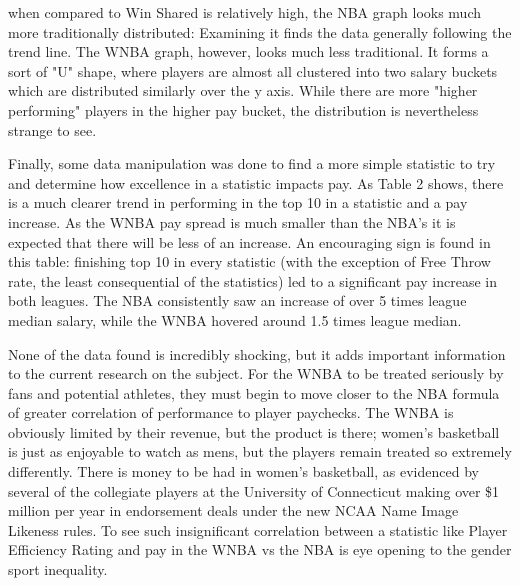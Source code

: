 \documentclass[12pt]{article}
\begin{document}
when compared to Win Shared is relatively high, the NBA graph looks much more traditionally distributed: Examining it finds the data generally following 
the trend line. The WNBA graph, however, looks much less traditional. It forms a sort of "U" shape, where players are almost all clustered into two salary 
buckets which are distributed similarly over the y axis. While there are more "higher performing" players in the higher pay bucket, the distribution is 
nevertheless strange to see.
\par
Finally, some data manipulation was done to find a more simple statistic to try and determine how excellence in a statistic impacts pay. As Table 2 shows, 
there is a much clearer trend in performing in the top 10 in a statistic and a pay increase. As the WNBA pay spread is much smaller than the NBA’s it is 
expected that there will be less of an increase. An encouraging sign is found in this table: finishing top 10 in every statistic (with the exception of 
Free Throw rate, the least consequential of the statistics) led to a significant pay increase in both leagues. The NBA consistently saw an increase of 
over 5 times league median salary, while the WNBA hovered around 1.5 times league median.
\par
None of the data found is incredibly shocking, but it adds important information to the current research on the subject. For the WNBA to be treated 
seriously by fans and potential athletes, they must begin to move closer to the NBA formula of greater correlation of performance to player paychecks. The 
WNBA is obviously limited by their revenue, but the product is there; women’s basketball is just as enjoyable to watch as mens, but the players remain 
treated so extremely differently. There is money to be had in women’s basketball, as evidenced by several of the collegiate players at the University of 
Connecticut making over \$1 million per year in endorsement deals under the new NCAA Name Image Likeness rules. To see such insignificant correlation 
between a statistic like Player Efficiency Rating and pay in the WNBA vs the NBA is eye opening to the gender sport inequality.
\end{document}
